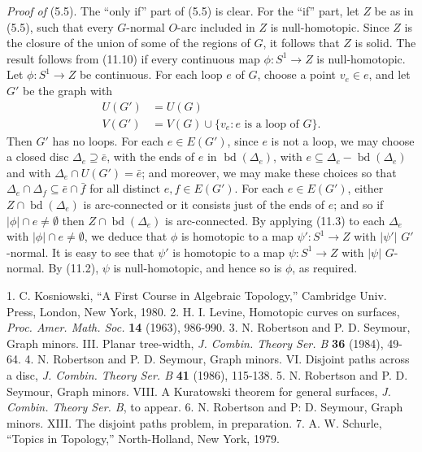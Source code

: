 \textit{Proof of} (5.5). The ``only if'' part of (5.5) is clear. For the ``if'' part, let $Z$ be as in (5.5), such that every $G$-normal $O$-arc included in $Z$ is null-homotopic. Since $Z$ is the closure of the union of some of the regions of $G$, it follows that $Z$ is solid. The result follows from (11.10) if every continuous map $\phi \colon S^1 \to Z$ is null-homotopic. Let $\phi \colon S^1 \to Z$ be continuous. For each loop $e$ of $G$, choose a point $v_e \in e$, and let $G'$ be the graph with
\begin{align*}
U(G') &= U(G) \\
V(G') &= V(G) \cup \{v_e \colon e \text{ is a loop of } G\}.
\end{align*}
Then $G'$ has no loops. For each $e \in E(G')$, since $e$ is not a loop, we may choose a closed disc $\Delta_e \supseteq \bar{e}$, with the ends of $e$ in $\operatorname{bd}(\Delta_e)$, with $e \subseteq \Delta_e - \operatorname{bd}(\Delta_e)$ and with $\Delta_e \cap U(G') = \bar{e}$; and moreover, we may make these choices so that $\Delta_e \cap \Delta_f \subseteq \bar{e} \cap \bar{f}$ for all distinct $e, f \in E(G')$. For each $e \in E(G')$, either $Z \cap \operatorname{bd}(\Delta_e)$ is arc-connected or it consists just of the ends of $e$; and so if $|\phi| \cap e \ne \emptyset$ then $Z \cap \operatorname{bd}(\Delta_e)$ is arc-connected. By applying (11.3) to each $\Delta_e$ with $|\phi| \cap e \ne \emptyset$, we deduce that $\phi$ is homotopic to a map $\psi' \colon S^1 \to Z$ with $|\psi'|$ $G'$-normal. It is easy to see that $\psi'$ is homotopic to a map $\psi \colon S^1 \to Z$ with $|\psi|$ $G$-normal. By (11.2), $\psi$ is null-homotopic, and hence so is $\phi$, as required.


1. C. Kosniowski, ``A First Course in Algebraic Topology,'' Cambridge Univ. Press, London, New York, 1980. 2. H. I. Levine, Homotopic curves on surfaces, \textit{Proc. Amer. Math. Soc.} \textbf{14} (1963), 986-990. 3. N. Robertson and P. D. Seymour, Graph minors. III. Planar tree-width, \textit{J. Combin. Theory Ser. B} \textbf{36} (1984), 49-64. 4. N. Robertson and P. D. Seymour, Graph minors. VI. Disjoint paths across a disc, \textit{J. Combin. Theory Ser. B} \textbf{41} (1986), 115-138. 5. N. Robertson and P. D. Seymour, Graph minors. VIII. A Kuratowski theorem for general surfaces, \textit{J. Combin. Theory Ser. B}, to appear. 6. N. Robertson and P: D. Seymour, Graph minors. XIII. The disjoint paths problem, in preparation. 7. A. W. Schurle, ``Topics in Topology,'' North-Holland, New York, 1979.
